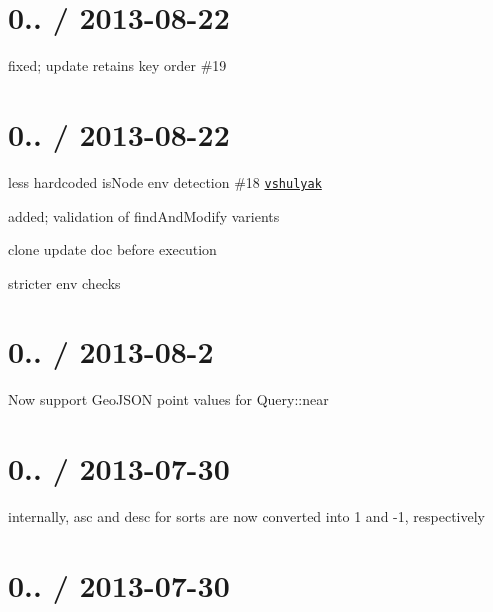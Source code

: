 \section*{0.. / 2013-\/08-\/22 }


\begin{DoxyItemize}
\item fixed; update retains key order \#19
\end{DoxyItemize}

\section*{0.. / 2013-\/08-\/22 }


\begin{DoxyItemize}
\item less hardcoded is\+Node env detection \#18 \href{https://github.com/vshulyak}{\tt vshulyak}
\item added; validation of find\+And\+Modify varients
\item clone update doc before execution
\item stricter env checks
\end{DoxyItemize}

\section*{0.. / 2013-\/08-\/2 }


\begin{DoxyItemize}
\item Now support Geo\+J\+S\+ON point values for Query\+::near
\end{DoxyItemize}

\section*{0.. / 2013-\/07-\/30 }


\begin{DoxyItemize}
\item internally, \textquotesingle{}asc\textquotesingle{} and \textquotesingle{}desc\textquotesingle{} for sorts are now converted into 1 and -\/1, respectively
\end{DoxyItemize}

\section*{0.. / 2013-\/07-\/30 }


